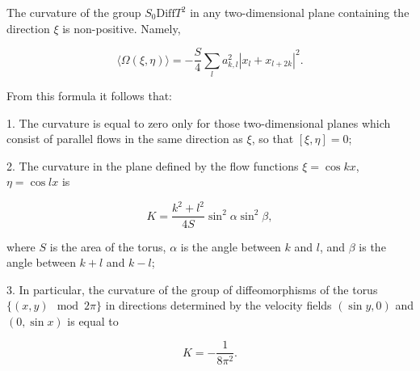 The curvature of the group $S_0 \text{Diff} T^2$ in any two-dimensional plane containing the direction $\xi$ is non-positive. Namely,

$$\langle \Omega(\xi, \eta) \rangle = -\frac{S}{4} \sum_l a_{k,l}^2 |x_l + x_{l+2k}|^2.$$

From this formula it follows that:

1. The curvature is equal to zero only for those two-dimensional planes which consist of parallel flows in the same direction as $\xi$, so that $[\xi, \eta] = 0$;

2. The curvature in the plane defined by the flow functions $\xi = \cos kx$, $\eta = \cos lx$ is

$$K = \frac{k^2 + l^2}{4S} \sin^2 \alpha \sin^2 \beta,$$

where $S$ is the area of the torus, $\alpha$ is the angle between $k$ and $l$, and $\beta$ is the angle between $k + l$ and $k - l$;

3. In particular, the curvature of the group of diffeomorphisms of the torus $\{(x, y) \mod 2\pi\}$ in directions determined by the velocity fields $(\sin y, 0)$ and $(0, \sin x)$ is equal to

$$K = -\frac{1}{8\pi^2}.$$

